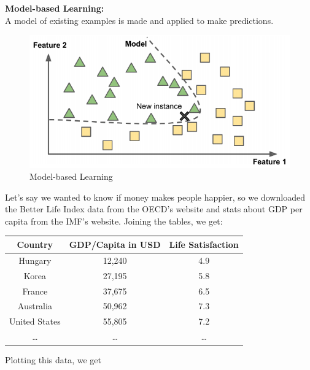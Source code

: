    \noindent \textbf{Model-based Learning:} \\
    A model of existing examples is made and applied to make predictions.

    \begin{figure}[hbt!]
        \centering
        \includegraphics[scale=0.5]{Resources/Model_based_learning}
        \caption*{Model-based Learning}
    \end{figure}

    \pagebreak

    \noindent Let's say we wanted to know if money makes people happier, so we downloaded the Better Life
    Index data from the OECD's website and stats about GDP per capita from the IMF's website. Joining the
    tables, we get:

    \begin{center}
        \begin{tabular}{|c|c|c|}
            \hline
            \textbf{Country} & \textbf{GDP/Capita in USD} & \textbf{Life Satisfaction} \\
            \hline
            Hungary         & 12,240 & 4.9 \\
            \hline
            Korea           & 27,195 & 5.8 \\
            \hline
            France          & 37,675 & 6.5 \\
            \hline
            Australia       & 50,962 & 7.3 \\
            \hline
            United States   & 55,805 & 7.2 \\
            \hline
            \dots           & \dots  & \dots \\
            \hline
        \end{tabular}
    \end{center}

    \noindent Plotting this data, we get

